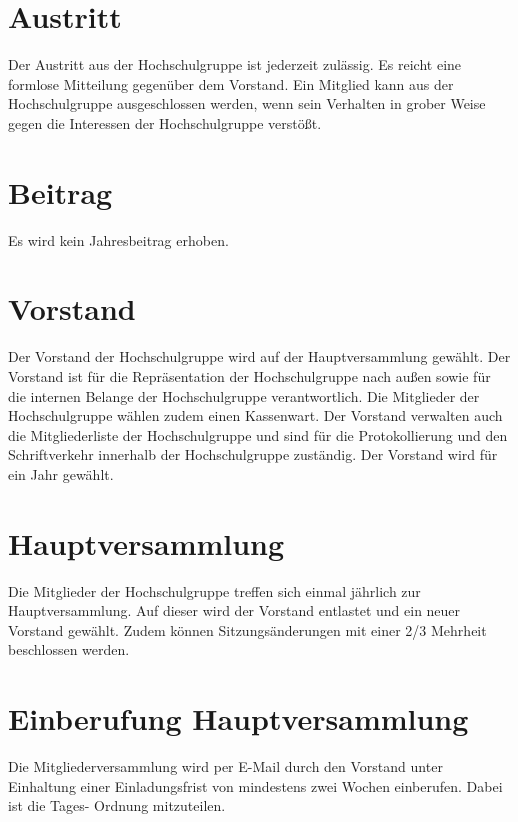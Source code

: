 \documentclass[a4paper, 11pt, parskip=no, headings=small]{scrartcl}
\begin{document}
\section{Austritt}
Der Austritt aus der Hochschulgruppe ist jederzeit zulässig. Es reicht eine formlose
Mitteilung gegenüber dem Vorstand. Ein Mitglied kann aus der Hochschulgruppe
ausgeschlossen werden, wenn sein Verhalten in grober Weise gegen die Interessen
der Hochschulgruppe verstößt.
\section{Beitrag}
Es wird kein Jahresbeitrag erhoben.
\section{Vorstand}
Der Vorstand der Hochschulgruppe wird auf der Hauptversammlung gewählt. Der Vorstand ist für die Repräsentation der Hochschulgruppe nach außen sowie für die
internen Belange der Hochschulgruppe verantwortlich. Die Mitglieder der
Hochschulgruppe wählen zudem einen Kassenwart. Der Vorstand verwalten auch die Mitgliederliste der Hochschulgruppe und sind für die Protokollierung und den Schriftverkehr innerhalb der Hochschulgruppe zuständig. Der Vorstand wird für ein Jahr gewählt.
\section{Hauptversammlung}
Die Mitglieder der Hochschulgruppe treffen sich einmal jährlich zur Hauptversammlung. Auf dieser wird der Vorstand entlastet und ein neuer Vorstand gewählt. Zudem können Sitzungsänderungen mit einer 2/3 Mehrheit beschlossen werden.
\section{Einberufung Hauptversammlung}
Die Mitgliederversammlung wird per E-Mail durch den Vorstand unter Einhaltung
einer Einladungsfrist von mindestens zwei Wochen einberufen. Dabei ist die Tages-
Ordnung mitzuteilen.
\end{document}
